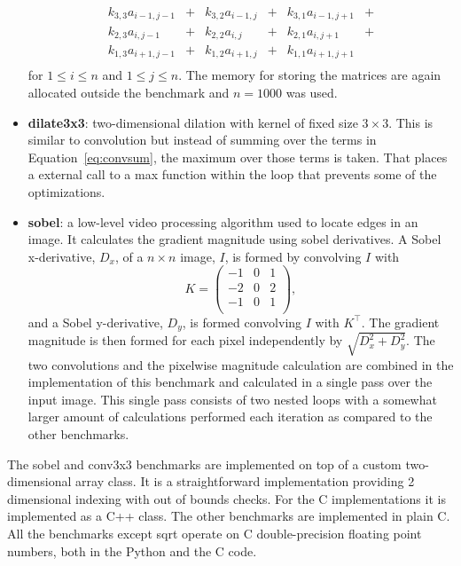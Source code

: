 \documentclass[preprint]{sigplanconf}
\begin{document}
\begin{itemize}
\begin{equation}
  \label{eq:convsum}
  \begin{array}{lclclc}
    k_{3,3} a_{i-1,j-1} &+& k_{3,2} a_{i-1,j} &+& k_{3,1} a_{i-1,j+1} & + \\
    k_{2,3} a_{i,j-1}   &+& k_{2,2} a_{i,j}   &+& k_{2,1} a_{i,j+1}   & + \\
    k_{1,3} a_{i+1,j-1} &+& k_{1,2} a_{i+1,j} &+& k_{1,1} a_{i+1,j+1}  \\
  \end{array}
\end{equation}
for $1 \leq i \leq n$ and $1 \leq j \leq n$.
The memory for storing the matrices are again allocated outside the benchmark and $n=1000$ was used.
\item {\bf dilate3x3}: two-dimensional dilation with kernel of fixed
  size $3 \times 3$. This is similar to convolution but instead of
  summing over the terms in Equation~\ref{eq:convsum}, the maximum over those terms is taken. That places a
  external call to a max function within the loop that prevents some
  of the optimizations.
\item {\bf sobel}: a low-level video processing algorithm used to
  locate edges in an image. It calculates the gradient magnitude
  using sobel derivatives. A Sobel x-derivative, $D_x$, of a $n \times n$ image, ${I}$, is formed
by convolving ${I}$ with
\begin{equation}
  {K} = \left(
  \begin{array}{ccc}
    -1 & 0 & 1 \\
    -2 & 0 & 2 \\
    -1 & 0 & 1 \\
  \end{array}
  \right) ,
\end{equation}
and a Sobel y-derivative, $D_y$, is formed convolving $I$ with $K^\top$. The gradient magnitude is 
then formed for each pixel independently by $\sqrt{D_x^2 + D_y^2}$. The two convolutions and the pixelwise
magnitude calculation are combined in the implementation of this benchmark and calculated in a single pass over
the input image. This single pass consists of two nested loops with a somewhat larger amount of calculations 
performed each iteration as compared to the other benchmarks.
\end{itemize}

The sobel and conv3x3 benchmarks are implemented
on top of a custom two-dimensional array class.
It is
a straightforward implementation providing 2 dimensional
indexing with out of bounds checks. For the C implementations it is
implemented as a C++ class. The other benchmarks are implemented in
plain C. All the benchmarks except sqrt operate on C double-precision floating
point numbers, both in the Python and the C code.
\end{document}
